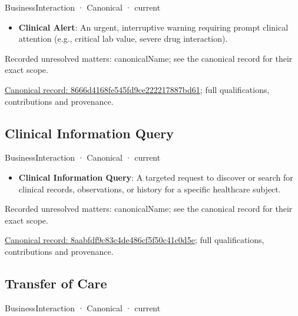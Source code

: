 \label{element:8666d4168fe545fd9ce222217887bd61}
{\small BusinessInteraction · Canonical · current}\par

\begin{itemize}


\item \textbf{Clinical Alert}: An urgent, interruptive warning requiring prompt clinical attention (e.g., critical lab value, severe drug interaction).

\end{itemize}

{\small Recorded unresolved matters: canonicalName; see the canonical record for their exact scope.}\par
{\footnotesize \href{../../../../continuum/business/business-interaction/8666d4168fe545fd9ce222217887bd61.md}{Canonical record: 8666d4168fe545fd9ce222217887bd61}; full qualifications, contributions and provenance.}\par
\subsection{Clinical Information Query}

\label{element:8aabfdf9c83c4de486cf5f50c41c0d5e}
{\small BusinessInteraction · Canonical · current}\par

\begin{itemize}


\item \textbf{Clinical Information Query}: A targeted request to discover or search for clinical records, observations, or history for a specific healthcare subject.

\end{itemize}

{\small Recorded unresolved matters: canonicalName; see the canonical record for their exact scope.}\par
{\footnotesize \href{../../../../continuum/business/business-interaction/8aabfdf9c83c4de486cf5f50c41c0d5e.md}{Canonical record: 8aabfdf9c83c4de486cf5f50c41c0d5e}; full qualifications, contributions and provenance.}\par
\subsection{Transfer of Care}

\label{element:8bb02a34807f4bb183bb42a722f4509b}
{\small BusinessInteraction · Canonical · current}\par

